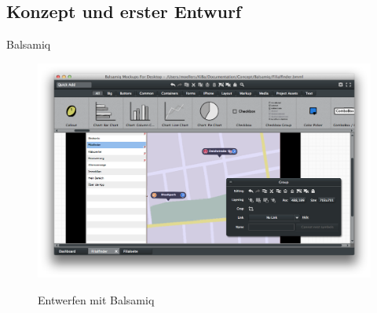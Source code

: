 \subsection{Konzept und erster Entwurf}
Balsamiq
\begin{figure}
	\centering
	\includegraphics[scale=.3]{Pictures/BalsamiqEntwurf}
	\label{fig:BalsamiqEntwurf}
	\caption{Entwerfen mit Balsamiq}
\end{figure}
